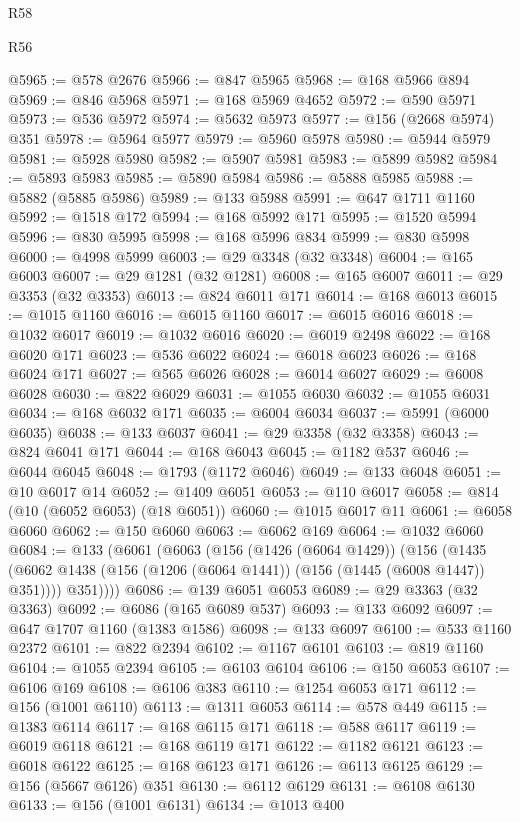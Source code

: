 \begin{lexlean}{R58}
\begin{lexlean}{R56}
\begin{coremodule}
{{{{{{{{{{{{{{{{{{{{{{{{{{{{{{{{{{{{{{{{{{{{{{{{{{{{{{{{{{{{{{{{{{{{{{{{{{{{{{{{{{{{{{{{{{{{{{{{{{{{{{{{{{{{{{{{{{{{{{{{{{{{{{{{{{{{{{{{{{{{{{{{{{{{{{{{{{{{{{{{{{{{{{{{{{{{{{{{{{{{{{{{{{{{{{{{{{{{{{{{{{{{{{{{{{{@5965 := @578 @2676
@5966 := @847 @5965
@5968 := @168 @5966 @894
@5969 := @846 @5968
@5971 := @168 @5969 @4652
@5972 := @590 @5971
@5973 := @536 @5972
@5974 := @5632 @5973
@5977 := @156 (@2668 @5974) @351
@5978 := @5964 @5977
@5979 := @5960 @5978
@5980 := @5944 @5979
@5981 := @5928 @5980
@5982 := @5907 @5981
@5983 := @5899 @5982
@5984 := @5893 @5983
@5985 := @5890 @5984
@5986 := @5888 @5985
@5988 := @5882 (@5885 @5986)
@5989 := @133 @5988
@5991 := @647 @1711 @1160
@5992 := @1518 @172
@5994 := @168 @5992 @171
@5995 := @1520 @5994
@5996 := @830 @5995
@5998 := @168 @5996 @834
@5999 := @830 @5998
@6000 := @4998 @5999
@6003 := @29 @3348 (@32 @3348)
@6004 := @165 @6003
@6007 := @29 @1281 (@32 @1281)
@6008 := @165 @6007
@6011 := @29 @3353 (@32 @3353)
@6013 := @824 @6011 @171
@6014 := @168 @6013
@6015 := @1015 @1160
@6016 := @6015 @1160
@6017 := @6015 @6016
@6018 := @1032 @6017
@6019 := @1032 @6016
@6020 := @6019 @2498
@6022 := @168 @6020 @171
@6023 := @536 @6022
@6024 := @6018 @6023
@6026 := @168 @6024 @171
@6027 := @565 @6026
@6028 := @6014 @6027
@6029 := @6008 @6028
@6030 := @822 @6029
@6031 := @1055 @6030
@6032 := @1055 @6031
@6034 := @168 @6032 @171
@6035 := @6004 @6034
@6037 := @5991 (@6000 @6035)
@6038 := @133 @6037
@6041 := @29 @3358 (@32 @3358)
@6043 := @824 @6041 @171
@6044 := @168 @6043
@6045 := @1182 @537
@6046 := @6044 @6045
@6048 := @1793 (@1172 @6046)
@6049 := @133 @6048
@6051 := @10 @6017 @14
@6052 := @1409 @6051
@6053 := @110 @6017
@6058 := @814 (@10 (@6052 @6053) (@18 @6051))
@6060 := @1015 @6017 @11
@6061 := @6058 @6060
@6062 := @150 @6060
@6063 := @6062 @169
@6064 := @1032 @6060
@6084 := @133
    (@6061
      (@6063
        (@156
          (@1426 (@6064 @1429))
          (@156
            (@1435 (@6062 @1438 (@156 (@1206 (@6064 @1441)) (@156 (@1445 (@6008 @1447)) @351))))
            @351))))
@6086 := @139 @6051 @6053
@6089 := @29 @3363 (@32 @3363)
@6092 := @6086 (@165 @6089 @537)
@6093 := @133 @6092
@6097 := @647 @1707 @1160 (@1383 @1586)
@6098 := @133 @6097
@6100 := @533 @1160 @2372
@6101 := @822 @2394
@6102 := @1167 @6101
@6103 := @819 @1160
@6104 := @1055 @2394
@6105 := @6103 @6104
@6106 := @150 @6053
@6107 := @6106 @169
@6108 := @6106 @383
@6110 := @1254 @6053 @171
@6112 := @156 (@1001 @6110)
@6113 := @1311 @6053
@6114 := @578 @449
@6115 := @1383 @6114
@6117 := @168 @6115 @171
@6118 := @588 @6117
@6119 := @6019 @6118
@6121 := @168 @6119 @171
@6122 := @1182 @6121
@6123 := @6018 @6122
@6125 := @168 @6123 @171
@6126 := @6113 @6125
@6129 := @156 (@5667 @6126) @351
@6130 := @6112 @6129
@6131 := @6108 @6130
@6133 := @156 (@1001 @6131)
@6134 := @1013 @400
}}}}}}}}}}}}}}}}}}}}}}}}}}}}}}}}}}}}}}}}}}}}}}}}}}}}}}}}}}}}}}}}}}}}}}}}}}}}}}}}}}}}}}}}}}}}}}}}}}}}}}}}}}}}}}}}}}}}}}}}}}}}}}}}}}}}}}}}}}}}}}}}}}}}}}}}}}}}}}}}}}}}}}}}}}}}}}}}}}}}}}}}}}}}}}}}}}}}}}}}}}}}}}}}}}}
\end{coremodule}
\end{lexlean}
\end{lexlean}
